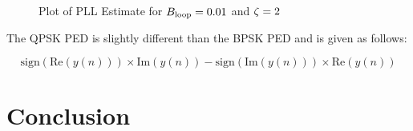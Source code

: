 \documentclass{article}
\begin{document}
\begin{figure}[H]
	\centerline{}
	\caption{Plot of PLL Estimate for $\protect{B_\text{loop}} = 0.01$ and $\protect{\zeta = 2}$}
	\label{fig::convergence_Bloop_0p01_damp_2}
\end{figure}

\noindent The QPSK PED is slightly different than the BPSK PED and is given as follows:

\begin{equation}
	\text{sign}(\text{Re}(y(n))) \times \text{Im}(y(n)) - \text{sign}(\text{Im}(y(n))) \times \text{Re}(y(n))
\end{equation}

\section{Conclusion}
\end{document}
